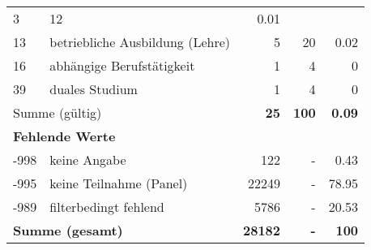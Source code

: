 \begin{longtable}{lXrrr}
       \num{3} &
       \num[round-mode=places,round-precision=2]{12} &
         \num[round-mode=places,round-precision=2]{0.01} \\

     13 &
     \multicolumn{1}{X}{ betriebliche Ausbildung (Lehre)   } &


       \num{5} &
       \num[round-mode=places,round-precision=2]{20} &
         \num[round-mode=places,round-precision=2]{0.02} \\

     16 &
     \multicolumn{1}{X}{ abhängige Berufstätigkeit   } &


       \num{1} &
       \num[round-mode=places,round-precision=2]{4} &
         \num[round-mode=places,round-precision=2]{0} \\

     39 &
     \multicolumn{1}{X}{ duales Studium   } &


       \num{1} &
       \num[round-mode=places,round-precision=2]{4} &
         \num[round-mode=places,round-precision=2]{0} \\
     \midrule
     \multicolumn{2}{l}{Summe (gültig)} &
       \textbf{\num{25}} &
     \textbf{\num{100}} &
       \textbf{\num[round-mode=places,round-precision=2]{0.09}} \\
     \multicolumn{5}{l}{\textbf{Fehlende Werte}}\\
       -998 &
       keine Angabe &
         \num{122} &
        - &
         \num[round-mode=places,round-precision=2]{0.43} \\
       -995 &
       keine Teilnahme (Panel) &
         \num{22249} &
        - &
         \num[round-mode=places,round-precision=2]{78.95} \\
       -989 &
       filterbedingt fehlend &
         \num{5786} &
        - &
         \num[round-mode=places,round-precision=2]{20.53} \\
     \midrule
     \multicolumn{2}{l}{\textbf{Summe (gesamt)}} &
          \textbf{\num{28182}} &
        \textbf{-} &
        \textbf{\num{100}} \\
     \bottomrule
     \end{longtable}
     
